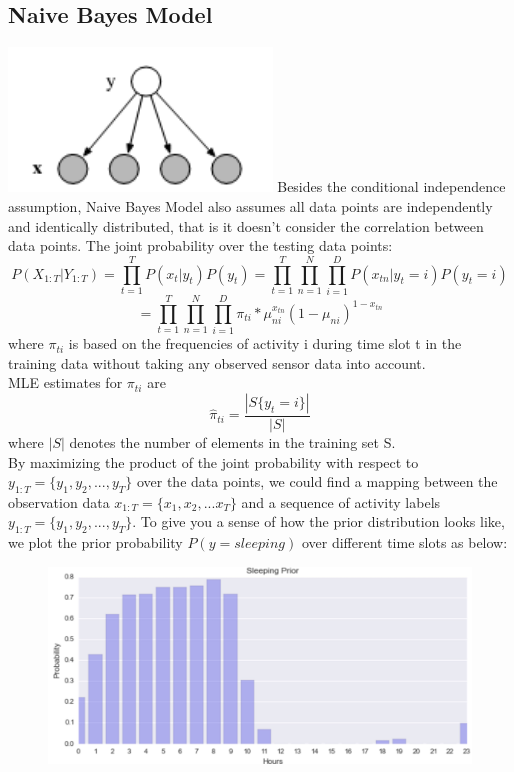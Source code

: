 \documentclass[10pt,letter]{article}
\numberwithin{equation}{section} %
\numberwithin{figure}{section} %
\numberwithin{table}{section} %
\begin{document}
\subsection{Naive Bayes Model}\includegraphics[width=7cm]{NB}
Besides the conditional independence assumption, Naive Bayes Model also assumes all data points are independently and identically distributed, that is it doesn't consider the correlation between data points. 
The joint probability over the testing data points:
$$P(X_{1:T}|Y_{1:T})= \prod_{t=1}^T P(x_t|y_t)P(y_t)= \prod_{t=1}^T\prod_{n=1}^N\prod_{i=1}^D P(x_{tn}|y_t = i)P(y_t=i)$$
$$ = \prod_{t=1}^T\prod_{n=1}^N\prod_{i=1}^D  \pi_{ti}*\mu_{ni}^{x_{tn}}(1-\mu_{ni})^{1-x_{tn}}$$
where $\pi_{ti}$ is based on the frequencies of activity i during time slot t in the training data without taking any observed sensor data into account. \\
MLE estimates for $\pi_{ti}$ are
$$\hat{\pi}_{ti} = \frac{|S\{y_t=i\}|} {|S|}$$
where $|S|$ denotes the number of elements in the training set S.\\
By maximizing the product of the joint probability with respect to $y_{1:T} = \{y_1,y_2,...,y_T\}$ over the data points, we could find a mapping between the observation data $x_{1:T} = \{x_1,x_2,...x_T\}$ and a sequence of activity labels $y_{1:T} = \{y_1,y_2,...,y_T\}$.
\newpage
To give you a sense of how the prior distribution looks like, we plot the prior probability $P(y= sleeping)$ over different time slots as below: \\
\begin{figure}[h]
    \centering
    \includegraphics[width=18cm]{sleeping_prior}
\end{figure}\\
\end{document}
